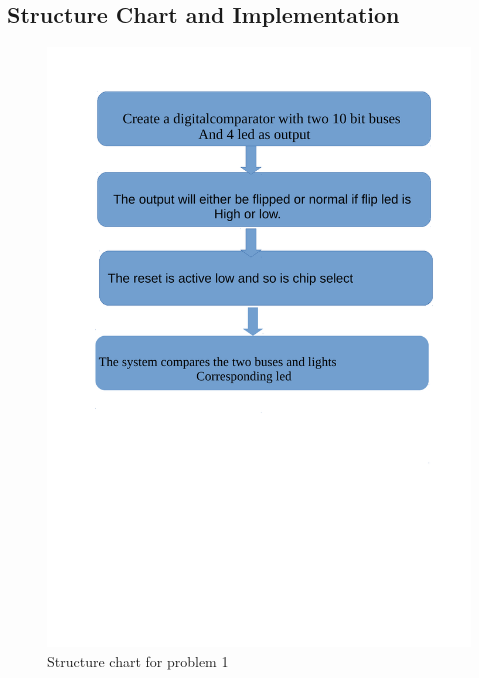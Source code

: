 \documentclass[11pt]{report}
\begin{document}
\subsection{Structure Chart and Implementation}
	\begin{figure}[h!]
	\centering
	\includegraphics[scale=0.5]{images/shots11}
	\caption{Structure chart for problem 1}
	\end{figure}		
	\pagebreak
	\pagebreak
\end{document}
